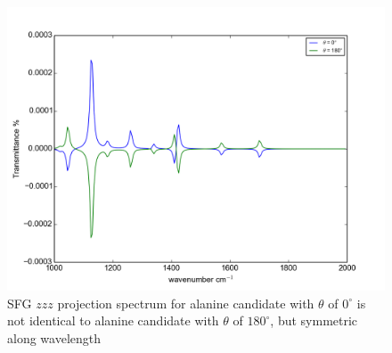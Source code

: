 \begin{figure}[!ht] 
\centering
\includegraphics[scale=0.7]{Figures/Ala_candidates_plotting_sfg_zzz_2.png}
\caption{SFG $zzz$ projection spectrum for alanine candidate with $\theta$ of $0^{\circ}$ is not identical to alanine candidate with $\theta$ of $180^{\circ}$, but symmetric along wavelength} \label{fig:5.9}
\end{figure}
